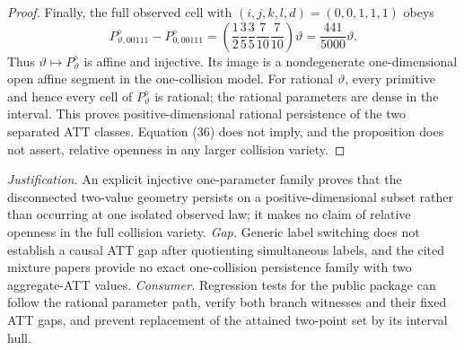 \documentclass{article}
\begin{document}
\begin{proof}
Finally, the full observed cell with \((i,j,k,l,d)=(0,0,1,1,1)\) obeys
\[
 P^{\diamond}_{\vartheta,00111}-P^{\diamond}_{0,00111}
 =\left(\frac12\frac35\frac35\frac7{10}\frac7{10}\right)\vartheta
 =\frac{441}{5000}\vartheta.
 \tag{36}
\]
Thus \(\vartheta\mapsto P^{\diamond}_{\vartheta}\) is affine and injective. Its image is a nondegenerate one-dimensional open affine segment in the one-collision model. For rational \(\vartheta\), every primitive and hence every cell of \(P^{\diamond}_{\vartheta}\) is rational; the rational parameters are dense in the interval. This proves positive-dimensional rational persistence of the two separated ATT classes. Equation (36) does not imply, and the proposition does not assert, relative openness in any larger collision variety.
\end{proof}
\par\smallskip\noindent \textit{Justification.} An explicit injective one-parameter family proves that the disconnected two-value geometry persists on a positive-dimensional subset rather than occurring at one isolated observed law; it makes no claim of relative openness in the full collision variety. \textit{Gap.} Generic label switching does not establish a causal ATT gap after quotienting simultaneous labels, and the cited mixture papers provide no exact one-collision persistence family with two aggregate-ATT values. \textit{Consumer.} Regression tests for the public package can follow the rational parameter path, verify both branch witnesses and their fixed ATT gaps, and prevent replacement of the attained two-point set by its interval hull.
\end{document}
